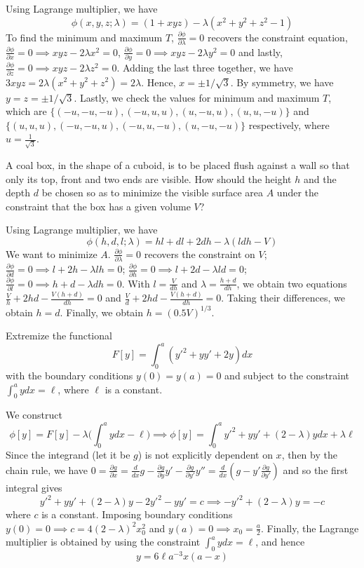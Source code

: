 \documentclass[a4paper]{article}
\begin{document}
\begin{ans}
Using Lagrange multiplier, we have $$\phi(x,y,z;\lambda)=(1+xyz)-\lambda(x^2+y^2+z^2-1)$$
To find the minimum and maximum $T$, $\frac{\partial\phi}{\partial\lambda}=0$ recovers the constraint equation, $\frac{\partial\phi}{\partial x}=0\implies xyz-2\lambda x^2=0$, $\frac{\partial\phi}{\partial y}=0\implies xyz-2\lambda y^2=0$ and lastly, $\frac{\partial\phi}{\partial z}=0\implies xyz-2\lambda z^2=0$. Adding the last three together, we have $3xyz=2\lambda(x^2+y^2+z^2)=2\lambda$. Hence, $x=\pm1/\sqrt{3}$. By symmetry, we have $y=z=\pm1/\sqrt{3}$. Lastly, we check the values for minimum and maximum $T$, which are $\{(-u,-u,-u),(-u,u,u),(u,-u,u),(u,u,-u)\}$ and $\{(u,u,u),(-u,-u,u),(-u,u,-u),(u,-u,-u)\}$ respectively, where $u=\frac{1}{\sqrt{3}}$. 
\end{ans}
\begin{qns}
A coal box, in the shape of a cuboid, is to be placed flush against a wall so that only its top, front and two ends are visible. How should the height $h$ and the depth $d$ be chosen so as to minimize the visible surface area $A$ under the constraint that the box has a given volume $V$?
\end{qns}
\begin{ans}
Using Lagrange multiplier, we have
$$\phi(h,d,l;\lambda)=hl+dl+2dh-\lambda(ldh-V)$$
We want to minimize $A$. $\frac{\partial\phi}{\partial\lambda}=0$ recovers the constraint on $V$; $\frac{\partial\phi}{\partial d}=0\implies l+2h-\lambda lh=0$; $\frac{\partial\phi}{\partial h}=0\implies l+2d-\lambda ld=0$; $\frac{\partial\phi}{\partial l}=0\implies h+d-\lambda dh=0$. With $l=\frac{V}{dh}$ and $\lambda=\frac{h+d}{dh}$, we obtain two equations $\frac{V}{h}+2hd-\frac{V(h+d)}{dh}=0$ and $\frac{V}{d}+2hd-\frac{V(h+d)}{dh}=0$. Taking their differences, we obtain $h=d$. Finally, we obtain $h=(0.5V)^{1/3}$.
\end{ans}
\newpage
\begin{qns}
Extremize the functional
$$F[y]=\int_0^a(y'^2+yy'+2y)dx$$
with the boundary conditions $y(0)=y(a)=0$ and subject to the constraint $\int_0^aydx=\ell$, where $\ell$ is a constant.
\end{qns}
\begin{ans}
We construct
$$\phi[y]=F[y]-\lambda\bigg(\int_0^aydx-\ell\bigg)\implies\phi[y]=\int_0^ay'^2+yy'+(2-\lambda)ydx+\lambda\ell$$
Since the integrand (let it be $g$) is not explicitly dependent on $x$, then by the chain rule, we have $0=\frac{\partial g}{\partial x}=\frac{d}{dx}g-\frac{\partial g}{\partial y}y'-\frac{\partial g}{\partial y'}y''=\frac{d}{dx}(g-y'\frac{\partial g}{\partial y'})$ and so the first integral gives
$$y'^2+yy'+(2-\lambda)y-2y'^2-yy'=c\implies -y'^2+(2-\lambda)y=-c$$
where $c$ is a constant. Imposing boundary conditions $y(0)=0\implies c=4(2-\lambda)^2x_0^2$ and $y(a)=0\implies x_0=\frac{a}{2}$. Finally, the Lagrange multiplier is obtained by using the constraint $\int_0^aydx=\ell$, and hence
$$y=6\ell a^{-3}x(a-x)$$
\end{ans}
\end{document}
